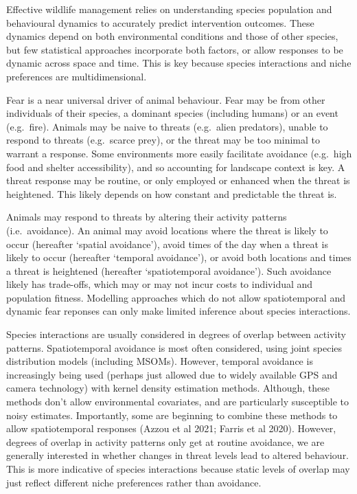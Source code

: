 \documentclass[]{elsarticle} %
\begin{document}
Effective wildlife management relies on understanding species population and behavioural dynamics to accurately predict intervention outcomes. These dynamics depend on both environmental conditions and those of other species, but few statistical approaches incorporate both factors, or allow responses to be dynamic across space and time. This is key because species interactions and niche preferences are multidimensional.

Fear is a near universal driver of animal behaviour. Fear may be from other individuals of their species, a dominant species (including humans) or an event (e.g.~fire). Animals may be naive to threats (e.g.~alien predators), unable to respond to threats (e.g.~scarce prey), or the threat may be too minimal to warrant a response. Some environments more easily facilitate avoidance (e.g.~high food and shelter accessibility), and so accounting for landscape context is key. A threat response may be routine, or only employed or enhanced when the threat is heightened. This likely depends on how constant and predictable the threat is.

Animals may respond to threats by altering their activity patterns (i.e.~avoidance). An animal may avoid locations where the threat is likely to occur (hereafter `spatial avoidance'), avoid times of the day when a threat is likely to occur (hereafter `temporal avoidance'), or avoid both locations and times a threat is heightened (hereafter `spatiotemporal avoidance'). Such avoidance likely has trade-offs, which may or may not incur costs to individual and population fitness. Modelling approaches which do not allow spatiotemporal and dynamic fear reponses can only make limited inference about species interactions.

Species interactions are usually considered in degrees of overlap between activity patterns. Spatiotemporal avoidance is most often considered, using joint species distribution models (including MSOMs). However, temporal avoidance is increasingly being used (perhaps just allowed due to widely available GPS and camera technology) with kernel density estimation methods. Although, these methods don't allow environmental covariates, and are particularly susceptible to noisy estimates. Importantly, some are beginning to combine these methods to allow spatiotemporal responses (Azzou et al 2021; Farris et al 2020). However, degrees of overlap in activity patterns only get at routine avoidance, we are generally interested in whether changes in threat levels lead to altered behaviour. This is more indicative of species interactions because static levels of overlap may just reflect different niche preferences rather than avoidance.
\end{document}
